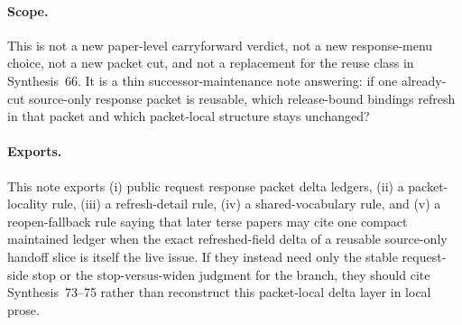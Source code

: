 \documentclass[11pt]{article}
\begin{document}
\paragraph{Scope.}
This is not a new paper-level carryforward verdict, not a new response-menu choice, not a new packet cut, and not a replacement for the reuse class in Synthesis~66.
It is a thin successor-maintenance note answering: if one already-cut source-only response packet is reusable, which release-bound bindings refresh in that packet and which packet-local structure stays unchanged?

\paragraph{Exports.}
This note exports (i) public request response packet delta ledgers, (ii) a packet-locality rule, (iii) a refresh-detail rule, (iv) a shared-vocabulary rule, and (v) a reopen-fallback rule saying that later terse papers may cite one compact maintained ledger when the exact refreshed-field delta of a reusable source-only handoff slice is itself the live issue. If they instead need only the stable request-side stop or the stop-versus-widen judgment for the branch, they should cite Synthesis~73--75 rather than reconstruct this packet-local delta layer in local prose.
\end{document}
